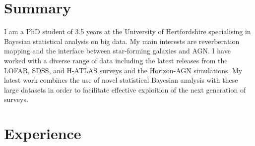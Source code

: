 \documentclass[letterpaper]{twentysecondcv} %
\begin{document}
\makeprofile %
 

\section{Summary}
     I am a PhD student of 3.5 years at the University of Hertfordshire specialising in Bayesian statistical analysis on big data. 
My main interests are reverberation mapping and the interface between star-forming galaxies and AGN. 
I have worked with a diverse range of data including the latest releases from the LOFAR, SDSS, and H-ATLAS surveys and the Horizon-AGN simulations. 
My latest work combines the use of novel statistical Bayesian analysis with these large datasets in order to facilitate effective exploition of the 
next generation of surveys.


\section{Experience}
\end{document}

